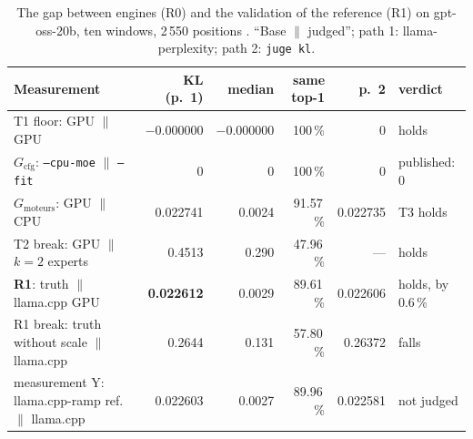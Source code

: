 \begin{table}[ht]
\centering\small
\caption[R0 and R1 on gpt-oss-20b]{The gap between engines (R0) and the validation of the reference (R1) on gpt-oss-20b, ten windows, 2\,550 positions \mes. \enquote{Base $\|$ judged}; path 1: llama-perplexity; path 2: \texttt{juge kl}.}
\label{tab:t2r-r0}
\begin{tabular}{@{}p{5.3cm}rrrrl@{}}
\toprule
Measurement & KL (p.~1) & median & same top-1 & p.~2 & verdict \\
\midrule
T1 floor: GPU $\|$ GPU & $-0.000000$ & $-0.000000$ & 100\,\% & 0 & holds \\
$G_{\text{cfg}}$: \texttt{--cpu-moe} $\|$ \texttt{--fit} & 0 & 0 & 100\,\% & 0 & published: 0 \\
$G_{\text{moteurs}}$: GPU $\|$ CPU & 0.022741 & 0.0024 & 91.57\,\% & 0.022735 & T3 holds \\
T2 break: GPU $\|$ $k = 2$ experts & 0.4513 & 0.290 & 47.96\,\% & --- & holds \\
\textbf{R1}: truth $\|$ llama.cpp GPU & \textbf{0.022612} & 0.0029 & 89.61\,\% & 0.022606 & holds, by 0.6\,\% \\
R1 break: truth without scale $\|$ llama.cpp & 0.2644 & 0.131 & 57.80\,\% & 0.26372 & falls \\
measurement Y: llama.cpp-ramp ref.\ $\|$ llama.cpp & 0.022603 & 0.0027 & 89.96\,\% & 0.022581 & not judged \\
\bottomrule
\end{tabular}
\end{table}

